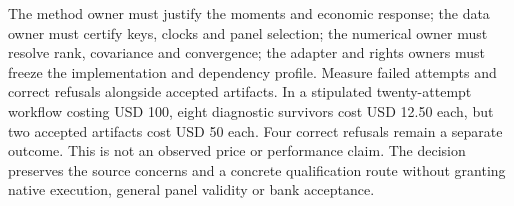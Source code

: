 The method owner must justify the moments and economic response; the data owner must
certify keys, clocks and panel selection; the numerical owner must resolve rank,
covariance and convergence; the adapter and rights owners must freeze the implementation
and dependency profile. Measure failed attempts and correct refusals alongside accepted
artifacts. In a stipulated twenty-attempt workflow costing USD 100, eight diagnostic
survivors cost USD 12.50 each, but two accepted artifacts cost USD 50 each. Four correct
refusals remain a separate outcome. This is not an observed price or performance claim.
The decision preserves the source concerns and a concrete qualification route without
granting native execution, general panel validity or bank acceptance.
\citep{exec24_pydynpd_reference}
